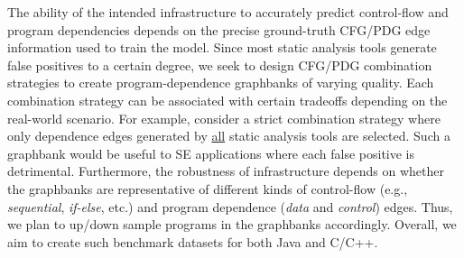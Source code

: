 
 The ability of the intended \tool infrastructure to accurately predict control-flow and program dependencies depends on the precise ground-truth CFG/PDG edge information used to train the model. Since most static analysis tools generate false positives to a certain degree, we seek to design CFG/PDG combination strategies to create program-dependence graphbanks of varying quality. Each combination strategy can be associated with certain tradeoffs depending on the real-world scenario. For example, consider a strict combination strategy where only dependence edges generated by \underline{all} static analysis tools are selected. Such a graphbank would be useful to SE applications where each false positive is detrimental. Furthermore, the robustness of \tool infrastructure depends on whether the graphbanks are representative of different kinds of control-flow (e.g., \textit{sequential}, \textit{if-else}, etc.) and program dependence (\textit{data} and \textit{control}) edges. Thus, we plan to up/down sample programs in the graphbanks accordingly. Overall, we aim to create such benchmark datasets for both Java and C/C++.

